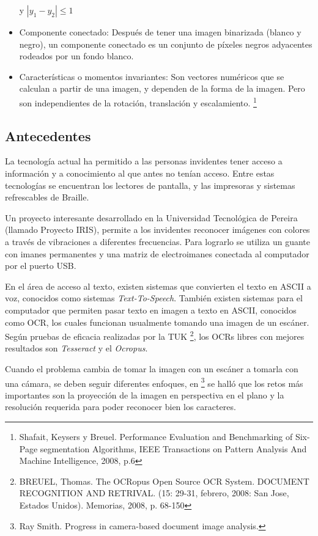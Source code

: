 \documentclass[a4paper, 11pt, oneside]{article}
\begin{document}
\begin{itemize}
    y $|y_1-y_2| \le 1$
    \item Componente conectado: Después de tener una imagen binarizada (blanco y negro), un
    componente conectado es un conjunto de píxeles negros adyacentes rodeados por un fondo blanco.
    \item Características o momentos invariantes: Son vectores numéricos que se calculan a partir
    de una imagen, y dependen de la forma de la imagen. Pero son independientes de la rotación,
    translación y escalamiento.
    \footnote{Shafait, Keysers y Breuel. Performance Evaluation and Benchmarking of Six-Page segmentation
    Algorithms, IEEE Transactions on Pattern Analysis And Machine Intelligence, 2008, p.6}
   
	\end{itemize}
	
	\subsection {Antecedentes}
	La tecnología actual ha permitido a las personas invidentes tener acceso a información
	y a conocimiento al que antes no tenían acceso. Entre estas tecnologías se encuentran los
	lectores de pantalla, y las impresoras y sistemas refrescables de Braille.
	
	Un proyecto interesante desarrollado en la Universidad Tecnológica de Pereira (llamado 
    Proyecto IRIS), permite a los invidentes reconocer imágenes con colores a través de 
    vibraciones a diferentes frecuencias. Para lograrlo se utiliza un guante con imanes 
	permanentes y una matriz de electroimanes conectada al computador por el puerto USB.

	En el área de acceso al texto, existen sistemas que convierten el texto en ASCII a voz,
	conocidos como sistemas \textit{Text-To-Speech}. También existen sistemas para el computador
	que permiten pasar texto en imagen a texto en ASCII, conocidos como OCR, los cuales funcionan
	usualmente tomando una imagen de un escáner. Según pruebas de eficacia realizadas por la TUK
    \footnote{BREUEL, Thomas. The OCRopus Open Source OCR System. DOCUMENT RECOGNITION AND RETRIVAL. 
    (15: 29-31, febrero, 2008: San Jose, Estados Unidos). Memorias, 2008, p. 68-150},
    los OCRs libres con mejores resultados son \textit{Tesseract} y el  \textit{Ocropus}. 

    Cuando el problema cambia de tomar la imagen con un escáner a tomarla con una cámara, 
    se deben seguir diferentes enfoques, en \footnote{Ray Smith. Progress in camera-based 
    document image analysis.} se halló que los retos más importantes son la proyección de 
    la imagen en perspectiva en el plano y la  resolución requerida para poder reconocer 
    bien los caracteres.
\end{document}
